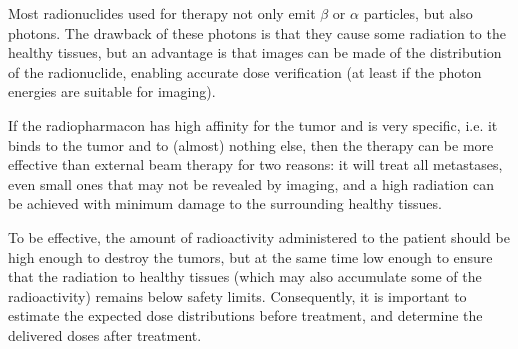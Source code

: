 \documentclass[11pt,oneside]{book}
\begin{document}
Most radionuclides used for therapy not only emit $\beta$ or $\alpha$
particles, but also photons. The drawback of these photons is that
they cause some radiation to the healthy tissues, but an advantage is
that images can be made of the distribution of the radionuclide,
enabling accurate dose verification (at least if the photon energies
are suitable for imaging).

If the radiopharmacon has high affinity for the tumor and is very
specific, i.e. it binds to the tumor and to (almost) nothing else,
then the therapy can be more effective than external beam therapy for
two reasons: it will treat all metastases, even small ones that may
not be revealed by imaging, and a high radiation can be achieved with
minimum damage to the surrounding healthy tissues.

To be effective, the amount of radioactivity administered to the
patient should be high enough to destroy the tumors, but at the same
time low enough to ensure that the radiation to healthy tissues (which
may also accumulate some of the radioactivity) remains below safety
limits. Consequently, it is important to estimate the expected dose
distributions before treatment, and determine the delivered doses
after treatment.
\end{document}
